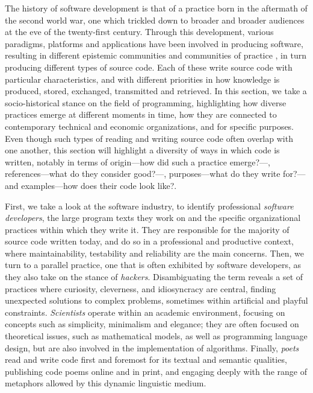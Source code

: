 The history of software development is that of a practice born in the aftermath of the second world war, one which trickled down to broader and broader audiences at the eve of the twenty-first century. Through this development, various paradigms, platforms and applications have been involved in producing software, resulting in different epistemic communities \citep{cohendet_organisational_2001} and communities of practice \citep{hayes_cultures_2015}, in turn producing different types of source code. Each of these write source code with particular characteristics, and with different priorities in how knowledge is produced, stored, exchanged, transmitted and retrieved. In this section, we take a socio-historical stance on the field of programming, highlighting how diverse practices emerge at different moments in time, how they are connected to contemporary technical and economic organizations, and for specific purposes. Even though such types of reading and writing source code often overlap with one another, this section will highlight a diversity of  ways in which code is written, notably in terms of origin—how did such a practice emerge?—, references—what do they consider good?—, purposes—what do they write for?—and examples—how does their code look like?.

First, we take a look at the software industry, to identify professional \emph{software developers}, the large program texts they work on and the specific organizational practices within which they write it. They are responsible for the majority of source code written today, and do so in a professional and productive context, where maintainability, testability and reliability are the main concerns. Then, we turn to a parallel practice, one that is often exhibited by software developers, as they also take on the stance of \emph{hackers}. Disambiguating the term reveals a set of practices where curiosity, cleverness, and idiosyncracy are central, finding unexpected solutions to complex problems, sometimes within artificial and playful constraints. \emph{Scientists} operate within an academic environment, focusing on concepts such as simplicity, minimalism and elegance; they are often focused on theoretical issues, such as mathematical models, as well as programming language design, but are also involved in the implementation of algorithms. Finally, \emph{poets} read and write code first and foremost for its textual and semantic qualities, publishing code poems online and in print, and engaging deeply with the range of metaphors allowed by this dynamic linguistic medium.

